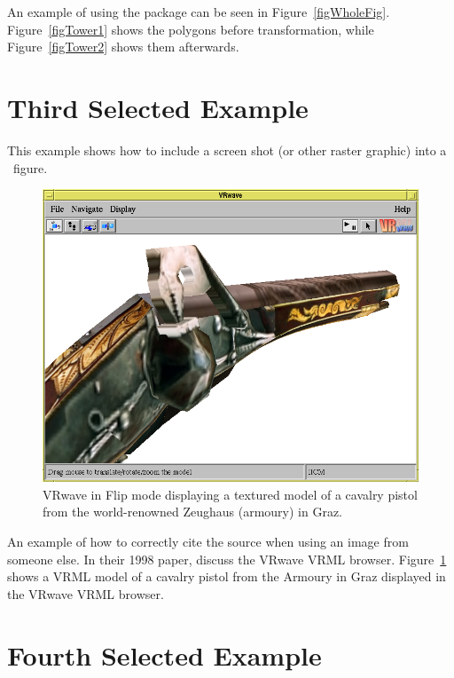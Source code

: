 An example of using the  package can be seen in
Figure~\ref{figWholeFig}. Figure~\ref{figTower1} shows the polygons
before transformation, while Figure~\ref{figTower2} shows them
afterwards.




\section{Third Selected Example}


This example shows how to include a screen shot (or other raster
graphic) into a \LaTeXe\ figure.

\begin{figure}[tp]
\centering
\includegraphics[keepaspectratio,width=\hsize]{images/pist}

\caption[VRwave in Flip Mode]
{%
VRwave in Flip mode displaying a textured model of a cavalry pistol
from the world-renowned Zeughaus (armoury) in Graz.
}
\label{fig:Pistol}
\end{figure}


An example of how to correctly cite the source when using an image
from someone else. In their 1998 paper, \citet{Andrews-VRwave} discuss
the VRwave VRML browser. Figure~\ref{fig:Pistol} shows a VRML model of
a cavalry pistol from the Armoury in Graz displayed in the VRwave VRML
browser.





\section{Fourth Selected Example}

